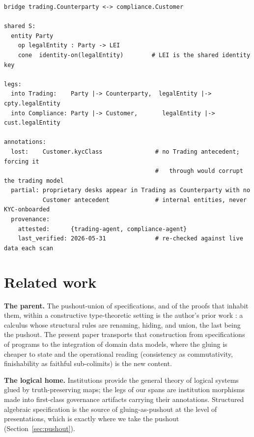 \documentclass[11pt]{article}
\theoremstyle{plain}
\theoremstyle{definition}
\begin{document}
\begin{lstlisting}[style=sketch,caption={The clean bridge of Example~\ref{ex:bridge} as a prose-anchored sketch: machine-checkable structure above, model-legible prose below.},label={lst:sketch}]
bridge trading.Counterparty <-> compliance.Customer

shared S:
  entity Party
    op legalEntity : Party -> LEI
    cone  identity-on(legalEntity)        # LEI is the shared identity key

legs:
  into Trading:    Party |-> Counterparty,  legalEntity |-> cpty.legalEntity
  into Compliance: Party |-> Customer,       legalEntity |-> cust.legalEntity

annotations:
  lost:    Customer.kycClass               # no Trading antecedent; forcing it
                                           #   through would corrupt the trading model
  partial: proprietary desks appear in Trading as Counterparty with no
           Customer antecedent             # internal entities, never KYC-onboarded
  provenance:
    attested:      {trading-agent, compliance-agent}
    last_verified: 2026-05-31              # re-checked against live data each scan
\end{lstlisting}

\section{Related work}\label{sec:related}

\textbf{The parent.} The pushout-union of specifications, and of the proofs that inhabit them, within a constructive type-theoretic setting is the author's prior work \cite{cpw2000,pwc2005}: a calculus whose structural rules are renaming, hiding, and union, the last being the pushout. The present paper transports that construction from specifications of programs to the integration of domain data models, where the gluing is cheaper to state and the operational reading (consistency as commutativity, finishability as faithful sub-colimits) is the new content.

\textbf{The logical home.} Institutions \cite{goguen-burstall} provide the general theory of logical systems glued by truth-preserving maps; the legs of our spans are institution morphisms made into first-class governance artifacts carrying their annotations. Structured algebraic specification \cite{sannella-tarlecki} is the source of gluing-as-pushout at the level of presentations, which is exactly where we take the pushout (Section~\ref{sec:pushout}).
\end{document}
